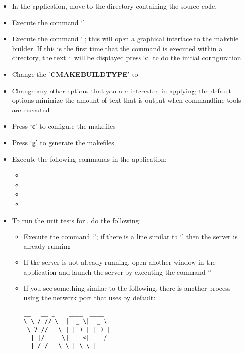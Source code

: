 \begin{itemize}
\item In the  application, move to the directory containing the \mplusm{}
source code, 
\item\exSp{}Execute the command `'
\item\exSp{}Execute the command `'; this will open a graphical interface
to the makefile builder. If this is the first time that the command is executed within a
directory, the text `' will be displayed \longDash{} press
`\textbf{c}' to do the initial configuration
\item\exSp{}Change the `\textbf{CMAKE\fUS{}BUILD\fUS{}TYPE}' to 
\item\exSp{}Change any other options that you are interested in applying; the default
options minimize the amount of text that is output when \mplusm{} command\longDash{}line
tools are executed
\item\exSp{}Press `\textbf{c}' to configure the makefiles
\item\exSp{}Press `\textbf{g}' to generate the makefiles
\item\exSp{}Execute the following commands in the  application:
\begin{itemize}
\item\exSp{}
\item\exSp{}
\item\exSp{}
\item\exSp{}
\end{itemize}
\item\exSp{}To run the unit tests for \mplusm, do the following:
\begin{itemize}
\item Execute the command `'; if there is a line
similar to `' then the \yarp{}
server is already running
\item\exSp{}If the \yarp{} server is not already running, open another window in the
 application and launch the \yarp{} server by executing the command
`'
\item\exSp{}If you see something similar to the following, there is another process using
the network port that \yarp{} uses by default:
\outputBegin
\begin{verbatim}
__   __ _    ____  ____  
\ \ / // \  |  _ \|  _ \ 
 \ V // _ \ | |_) | |_) |
  | |/ ___ \|  _ <|  __/ 
  |_/_/   \_\_| \_\_|    


\end{verbatim}
\end{itemize}
\end{itemize}
